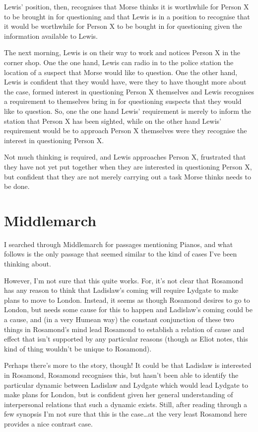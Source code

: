\documentclass[10pt]{article}
\begin{document}
Lewis' position, then, recognises that Morse thinks it is worthwhile for Person X to be brought in for questioning and that Lewis is in a position to recognise that it would be worthwhile for Person X to be bought in for questioning given the information available to Lewis.

The next morning, Lewis is on their way to work and notices Person X in the corner shop.
One the one hand, Lewis can radio in to the police station the location of a suspect that Morse would like to question.
One the other hand, Lewis is confident that they would have, were they to have thought more about the case, formed interest in questioning Person X themselves and Lewis recognises a requirement to themselves bring in for questioning suspects that they would like to question.
So, one the one hand Lewis' requirement is merely to inform the station that Person X has been sighted, while on the other hand Lewis' requirement would be to approach Person X themselves were they recognise the interest in questioning Person X.

Not much thinking is required, and Lewis approaches Person X, frustrated that they have not yet put together when they are interested in questioning Person X, but confident that they are not merely carrying out a task Morse thinks needs to be done.

\section{Middlemarch}
\label{sec:middlemarch}

\begin{note}
  I searched through Middlemarch for passages mentioning Pianos, and what follows is the only passage that seemed similar to the kind of cases I've been thinking about.

  However, I'm not sure that this quite works.
  For, it's not clear that Rosamond has any reason to think that Ladislaw's coming will require Lydgate to make plans to move to London.
  Instead, it seems as though Rosamond desires to go to London, but needs some cause for this to happen and Ladislaw's coming could be a cause, and (in a very Humean way) the constant conjunction of these two things in Rosamond's mind lead Rosamond to establish a relation of cause and effect that isn't supported by any particular reasons (though as Eliot notes, this kind of thing wouldn't be unique to Rosamond).

  Perhaps there's more to the story, though!
  It could be that Ladislaw is interested in Rosamond, Rosamond recognises this, but hasn't been able to identify the particular dynamic between Ladislaw and Lydgate which would lead Lydgate to make plans for London, but is confident given her general understanding of interpersonal relations that such a dynamic exists.
  Still, after reading through a few synopsis I'm not sure that this is the case\dots at the very least Rosamond here provides a nice contrast case.
\end{note}
\end{document}
